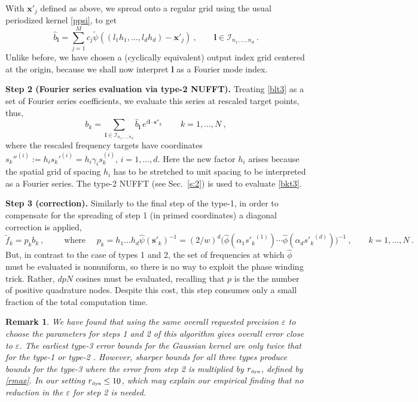 \documentclass[10pt]{article}
\newcommand{\be}{\begin{equation}}
\newcommand{\ee}{\end{equation}}
\newcommand{\tbox}[1]{{\mbox{\tiny #1}}}
\newcommand{\mbf}[1]{{\mathbf #1}}
\newcommand{\eps}{\varepsilon}
\newtheorem{rmk}[thm]{Remark}
\newcommand{\xx}{\mbf{x}}
\newcommand{\sss}{\mbf{s}}
\newcommand{\KK}{{\mathcal I}}     %
\newcommand{\ppsi}{{\tilde\psi}}   %
\newcommand{\rmax}{r_\tbox{dyn}}    %
\newcommand{\NU}{{nonuniform}}       %
\begin{document}
With $\xx'_j$ defined as above,
we spread onto a regular grid using the usual
periodized kernel \eqref{ppsi}, to get
\be
\hat b_\mbf{l} = \sum_{j=1}^M c_j \ppsi((l_1h_1,\dots,l_dh_d)-\xx'_j)~,
\qquad \mbf{l} \in \KK_{n_1,\dots,n_d}~.
\label{blt3}
\ee
Unlike before, we have chosen a (cyclically equivalent) output index
grid centered at the origin, because we
shall now interpret $\mbf{l}$ as a Fourier mode index.

{\bf Step 2 (Fourier series evaluation via type-2 NUFFT).}
Treating \eqref{blt3} as a set of Fourier series coefficients, we
evaluate this series at rescaled target points, thus,
\be
b_k = \sum_{\mbf{l} \in \KK_{n_1,\dots,n_d}}
\!\! \hat b_\mbf{l} \, e^{i\mbf{l}\cdot \sss''_k}
\,\qquad k=1,\dots,N
~,
\label{bkt3}
\ee
where the rescaled frequency targets have coordinates
${s_k''}^{(i)} := h_i {s_k'}^{(i)} = h_i\gamma_i s_k^{(i)}$, $i=1,\dots,d$.
Here the new factor $h_i$ arises because the spatial grid of spacing $h_i$
has to be stretched to unit spacing to be interpreted as a Fourier series.
The type-2 NUFFT (see Sec.~\ref{s:2}) is used to evaluate \eqref{bkt3}.

{\bf Step 3 (correction).}
Similarly to the final step of the type-1,
in order to compensate for the spreading of step 1 (in primed coordinates)
a diagonal correction is applied,
$$
\tilde f_k = p_k b_k
~,\qquad 
\mbox{ where }
\quad p_k = h_1\dots h_d \hat\psi(\sss'_k)^{-1} = (2/w)^d
\bigl(
\hat\phi(\alpha_1{s'_k}^{(1)}) \cdots \hat\phi(\alpha_d{s'_k}^{(d)})
\bigr)^{-1}
~,
\qquad k=1,\dots,N
~.
$$
But, in contrast to the case of types 1 and 2,
the set of frequencies at which $\hat\phi$ must be evaluated is %
\NU, so there is no way to exploit the phase winding trick.
Rather, $dpN$ cosines must be evaluated,
recalling that $p$ is the the number of positive quadrature nodes.
Despite this cost, this step consumes only a small fraction of the
total computation time.

\begin{rmk}
  We have found that using the same overall requested precision $\eps$ to
  choose the parameters for steps 1 and 2 of this algorithm
  gives overall error close to $\eps$.
  The earliest type-3 error bounds for the Gaussian kernel are only twice that
  for the type-1 or type-2 \cite[Obs.~5.6]{nufft}.
  However, sharper bounds \cite[p.~45]{elbel} for all three types produce
  bounds for the type-3 where the error from step 2 is multiplied by
  $\rmax$, defined by \eqref{rmax}.
  In our setting $\rmax \le 10$, which may explain our empirical finding
  that no reduction in the $\eps$ for step 2 is needed.
\end{rmk}
\end{document}
